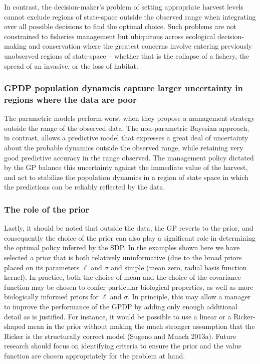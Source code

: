 \documentclass[]{components/elsarticle}
\begin{document}
In contrast, the decision-maker's problem of setting appropriate harvest
levels cannot exclude regions of state-space outside the observed range
when integrating over all possible decisions to find the optimal choice.
Such problems are not constrained to fisheries management but ubiquitous
across ecological decision-making and conservation where the greatest
concerns involve entering previously unobserved regions of state-space
-- whether that is the collapse of a fishery, the spread of an invasive,
or the loss of habitat.

\subsubsection{GPDP population dynamcis capture larger uncertainty in
regions where the data are
poor}\label{gpdp-population-dynamcis-capture-larger-uncertainty-in-regions-where-the-data-are-poor}

The parametric models perform worst when they propose a management
strategy outside the range of the observed data. The non-parametric
Bayesian approach, in contrast, allows a predictive model that expresses
a great deal of uncertainty about the probable dynamics outside the
observed range, while retaining very good predictive accuracy in the
range observed. The management policy dictated by the GP balance this
uncertainty against the immediate value of the harvest, and act to
stabilize the population dynamics in a region of state space in which
the predictions can be reliably reflected by the data.

\subsubsection{The role of the prior}\label{the-role-of-the-prior}

Lastly, it should be noted that outside the data, the GP reverts to the
prior, and consequently the choice of the prior can also play a
significant role in determining the optimal policy inferred by the SDP.
In the examples shown here we have selected a prior that is both
relatively uninformative (due to the broad priors placed on its
parameters $\ell$ and $\sigma$ and simple (mean zero, radial basis
function kernel). In practice, both the choice of mean and the choice of
the covariance function may be chosen to confer particular biological
properties, as well as more biologically informed priors for $\ell$ and
$\sigma$. In principle, this may allow a manager to improve the
performance of the GPDP by adding only enough additional detail as is
justified. For instance, it would be possible to use a linear or a
Ricker-shaped mean in the prior without making the much stronger
assumption that the Ricker is the structurally correct model (Sugeno and
Munch 2013a). Future research should focus on identifying criteria to
ensure the prior and the value function are chosen appropriately for the
problem at hand.
\end{document}
